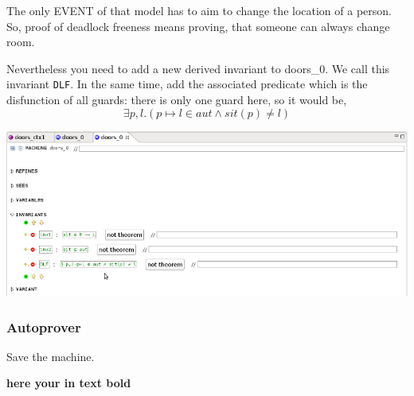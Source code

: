 The only \textsf{EVENT} of that model has to aim to change the location of a person.
So, proof of deadlock freeness means proving, that someone can always change room.

Nevertheless you need to add a new derived invariant to doors\_0. We call this invariant \texttt{DLF}.
In the same time, add the associated predicate which is the disfunction of all guards: there is only one guard here, so it would be,
\[
\exists p,l.(p \longmapsto l \in aut \land sit(p) \neq l )
\]


\begin{center}
	\includegraphics[]{img/tutorial/new-invariant.png}
\end{center}

\subsubsection{Autoprover}

Save the machine.



\textbf{here your in text bold}
